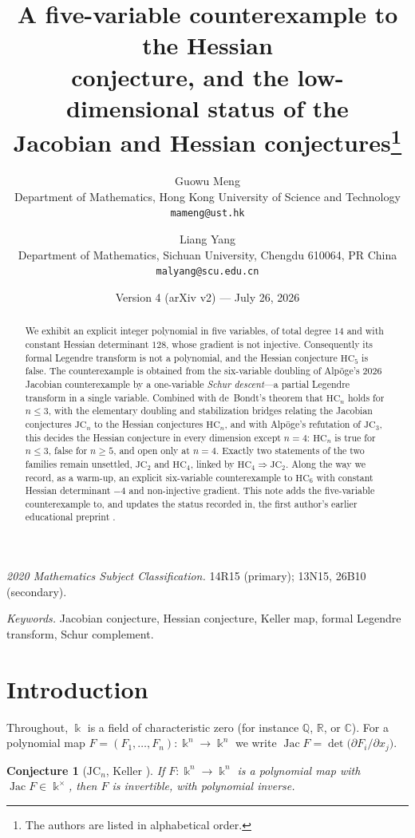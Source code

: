 \documentclass[11pt]{article}
\title{\bf A five-variable counterexample to the Hessian\\
conjecture, and the low-dimensional status of the\\
Jacobian and Hessian conjectures\thanks{The authors are listed in
alphabetical order.}}
\author{Guowu Meng\\[2pt]
\small Department of Mathematics, Hong Kong University of Science and
Technology\\[-2pt]
\small \texttt{mameng@ust.hk}
\and
Liang Yang\\[2pt]
\small Department of Mathematics, Sichuan University, Chengdu 610064,
PR China\\[-2pt]
\small \texttt{malyang@scu.edu.cn}}
\date{Version 4 (arXiv v2) --- July 26, 2026}
\theoremstyle{plain}
\newtheorem{conjecture}[theorem]{Conjecture}
\theoremstyle{definition}
\newcommand{\C}{\mathbb{C}}
\newcommand{\R}{\mathbb{R}}
\newcommand{\Q}{\mathbb{Q}}
\newcommand{\kk}{\Bbbk}
\newcommand{\JC}{\mathrm{JC}}
\newcommand{\HC}{\mathrm{HC}}
\newcommand{\Jac}{\operatorname{Jac}}
\begin{document}
\maketitle

\begin{abstract}
We exhibit an explicit integer polynomial in five variables, of total
degree $14$ and with constant Hessian determinant $128$, whose gradient
is not injective. Consequently its formal Legendre transform is not a
polynomial, and the Hessian conjecture $\HC_5$ is false. The counterexample is obtained from the
six-variable doubling of Alp\"oge's 2026 Jacobian counterexample by a
one-variable \emph{Schur descent}---a partial Legendre transform in a
single variable. Combined with de~Bondt's theorem that
$\HC_n$ holds for $n\le3$, with the elementary doubling and
stabilization bridges relating the Jacobian conjectures $\JC_n$ to the
Hessian conjectures $\HC_n$, and with Alp\"oge's refutation of $\JC_3$,
this decides the Hessian conjecture in every dimension except $n=4$:
$\HC_n$ is true for $n\le3$, false for $n\ge5$, and open only at $n=4$.
Exactly two statements of the two families remain unsettled, $\JC_2$
and $\HC_4$, linked by $\HC_4 \Rightarrow \JC_2$. Along the way we
record, as a warm-up, an explicit six-variable counterexample to
$\HC_6$ with constant Hessian determinant $-4$ and non-injective
gradient. This note adds the five-variable counterexample to, and
updates the status recorded in, the first author's earlier educational
preprint \cite{MengRG2026}.
\end{abstract}

\medskip
\noindent\emph{2020 Mathematics Subject Classification.} 14R15 (primary);
13N15, 26B10 (secondary).

\noindent\emph{Keywords.} Jacobian conjecture, Hessian conjecture,
Keller map, formal Legendre transform, Schur complement.

\section{Introduction}

Throughout, $\kk$ is a field of characteristic zero (for instance $\Q$,
$\R$, or $\C$). For a polynomial
map $F=(F_1,\dots,F_n)\colon \kk^n\to\kk^n$ we write
$\Jac F=\det\bigl(\partial F_i/\partial x_j\bigr)$.

\begin{conjecture}[$\JC_n$, Keller \cite{Keller1939}]
If $F\colon \kk^n\to\kk^n$ is a polynomial map with
$\Jac F\in\kk^{\times}$, then $F$ is invertible, with polynomial
inverse.
\end{conjecture}
\end{document}
